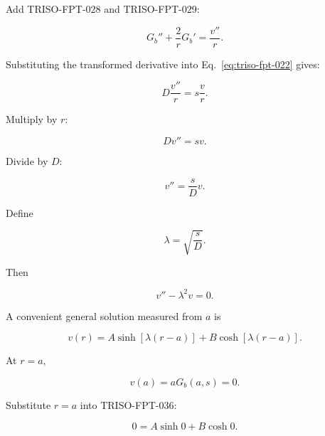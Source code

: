 \documentclass[11pt,a4paper]{article}
\begin{document}
Add TRISO-FPT-028 and TRISO-FPT-029:

\begin{equation}
G_b''+\frac{2}{r}G_b'
=
\frac{v''}{r}.
\tag{TRISO-FPT-030}
\label{eq:triso-fpt-030}
\end{equation}

Substituting the transformed derivative into Eq.~\eqref{eq:triso-fpt-022} gives:

\begin{equation}
D\frac{v''}{r}
=
s\frac{v}{r}.
\tag{TRISO-FPT-031}
\label{eq:triso-fpt-031}
\end{equation}

Multiply by $r$:

\begin{equation}
Dv''=sv.
\tag{TRISO-FPT-032}
\label{eq:triso-fpt-032}
\end{equation}

Divide by $D$:

\begin{equation}
v''=\frac{s}{D}v.
\tag{TRISO-FPT-033}
\label{eq:triso-fpt-033}
\end{equation}

Define

\begin{equation}
\lambda=\sqrt{\frac{s}{D}}.
\tag{TRISO-FPT-034}
\label{eq:triso-fpt-034}
\end{equation}

Then

\begin{equation}
v''-\lambda^2v=0.
\tag{TRISO-FPT-035}
\label{eq:triso-fpt-035}
\end{equation}

A convenient general solution measured from $a$ is

\begin{equation}
v(r)
=
A\sinh[\lambda(r-a)]
+
B\cosh[\lambda(r-a)].
\tag{TRISO-FPT-036}
\label{eq:triso-fpt-036}
\end{equation}

At $r=a$,

\begin{equation}
v(a)=aG_b(a,s)=0.
\tag{TRISO-FPT-037}
\label{eq:triso-fpt-037}
\end{equation}

Substitute $r=a$ into TRISO-FPT-036:

\begin{equation}
0=A\sinh0+B\cosh0.
\tag{TRISO-FPT-038}
\label{eq:triso-fpt-038}
\end{equation}
\end{document}

